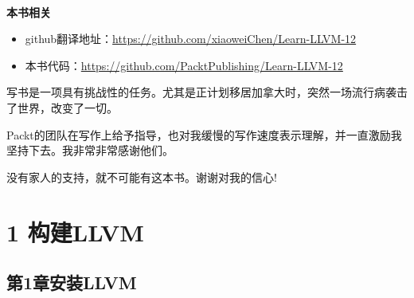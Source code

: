 \documentclass[11pt,a4paper,UTF8]{ctexart}
\begin{document}
	
	\hspace*{\fill} \\ %
	\noindent\textbf{本书相关}\ \par
	\begin{itemize}
		\item github翻译地址：\url{https://github.com/xiaoweiChen/Learn-LLVM-12}
		\item 本书代码：\url{https://github.com/PacktPublishing/Learn-LLVM-12}
	\end{itemize}
	\newpage
	
	
	\begin{center}
		\vspace*{\fill}
		写书是一项具有挑战性的任务。尤其是正计划移居加拿大时，突然一场流行病袭击了世界，改变了一切。\par
		
		\hspace*{\fill} \par
		
		Packt的团队在写作上给予指导，也对我缓慢的写作速度表示理解，并一直激励我坚持下去。我非常非常感谢他们。\par
		
		\hspace*{\fill} \par
		
		没有家人的支持，就不可能有这本书。谢谢对我的信心!\par
		
		\vspace*{\fill}
	\end{center}
	
	\newpage
	
	\tableofcontents
	\newpage
	
	\pagestyle{empty}
	

	
	\color{white}
	\section*{ 1 构建LLVM}
	\pagecolor{mygray}
	
	\color{black}
	\pagecolor{white}
	
	\subsection*{ 第1章\hspace{0.5cm}安装LLVM}
	
	
\end{document}
